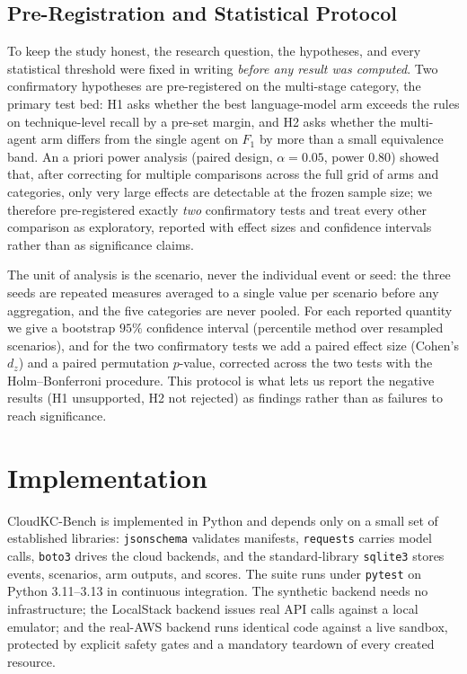 \documentclass[journal]{IEEEtran}
\begin{document}
\subsection{Pre-Registration and Statistical Protocol}
To keep the study honest, the research question, the hypotheses, and every statistical threshold were
fixed in writing \emph{before any result was computed}. Two confirmatory hypotheses are pre-registered
on the multi-stage category, the primary test bed: H1 asks whether the best language-model arm exceeds
the rules on technique-level recall by a pre-set margin, and H2 asks whether the multi-agent arm differs
from the single agent on $F_1$ by more than a small equivalence band. An a priori power analysis (paired
design, $\alpha=0.05$, power $0.80$) showed that, after correcting for multiple comparisons across the
full grid of arms and categories, only very large effects are detectable at the frozen sample size; we
therefore pre-registered exactly \emph{two} confirmatory tests and treat every other comparison as
exploratory, reported with effect sizes and confidence intervals rather than as significance claims.

The unit of analysis is the scenario, never the individual event or seed: the three seeds are repeated
measures averaged to a single value per scenario before any aggregation, and the five categories are
never pooled. For each reported quantity we give a bootstrap $95\%$ confidence interval (percentile
method over resampled scenarios), and for the two confirmatory tests we add a paired effect size
(Cohen's $d_z$) and a paired permutation $p$-value, corrected across the two tests with the
Holm--Bonferroni procedure. This protocol is what lets us report the negative results (H1 unsupported,
H2 not rejected) as findings rather than as failures to reach significance.

\section{Implementation}\label{sec:impl}
CloudKC-Bench is implemented in Python and depends only on a small set of established libraries:
\texttt{jsonschema} validates manifests, \texttt{requests} carries model calls, \texttt{boto3} drives
the cloud backends, and the standard-library \texttt{sqlite3} stores events, scenarios, arm outputs,
and scores. The suite runs under \texttt{pytest} on Python 3.11--3.13 in continuous integration. The
synthetic backend needs no infrastructure; the LocalStack backend issues real API calls against a
local emulator; and the real-AWS backend runs identical code against a live sandbox, protected by
explicit safety gates and a mandatory teardown of every created resource.
\end{document}
